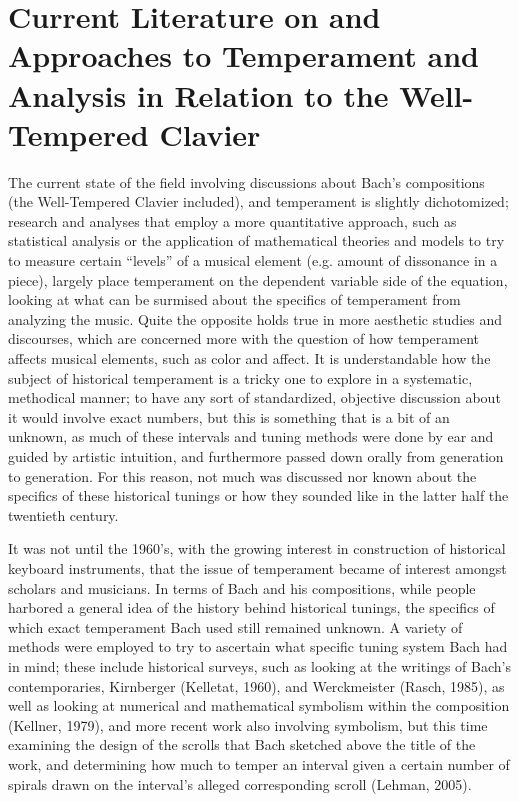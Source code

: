     \section{Current Literature on and Approaches to Temperament and
Analysis in Relation to the Well-Tempered
Clavier}\label{current-literature-on-and-approaches-to-temperament-and-analysis-in-relation-to-the-well-tempered-clavier}

The current state of the field involving discussions about Bach's
compositions (the Well-Tempered Clavier included), and temperament is
slightly dichotomized; research and analyses that employ a more
quantitative approach, such as statistical analysis or the application
of mathematical theories and models to try to measure certain ``levels''
of a musical element (e.g. amount of dissonance in a piece), largely
place temperament on the dependent variable side of the equation,
looking at what can be surmised about the specifics of temperament from
analyzing the music. Quite the opposite holds true in more aesthetic
studies and discourses, which are concerned more with the question of
how temperament affects musical elements, such as color and affect. It
is understandable how the subject of historical temperament is a tricky
one to explore in a systematic, methodical manner; to have any sort of
standardized, objective discussion about it would involve exact numbers,
but this is something that is a bit of an unknown, as much of these
intervals and tuning methods were done by ear and guided by artistic
intuition, and furthermore passed down orally from generation to
generation. For this reason, not much was discussed nor known about the
specifics of these historical tunings or how they sounded like in the
latter half the twentieth century.

It was not until the 1960's, with the growing interest in construction
of historical keyboard instruments, that the issue of temperament became
of interest amongst scholars and musicians. In terms of Bach and his
compositions, while people harbored a general idea of the history behind
historical tunings, the specifics of which exact temperament Bach used
still remained unknown. A variety of methods were employed to try to
ascertain what specific tuning system Bach had in mind; these include
historical surveys, such as looking at the writings of Bach's
contemporaries, Kirnberger (Kelletat, 1960), and Werckmeister (Rasch,
1985), as well as looking at numerical and mathematical symbolism within
the composition (Kellner, 1979), and more recent work also involving
symbolism, but this time examining the design of the scrolls that Bach
sketched above the title of the work, and determining how much to temper
an interval given a certain number of spirals drawn on the interval's
alleged corresponding scroll (Lehman, 2005).

